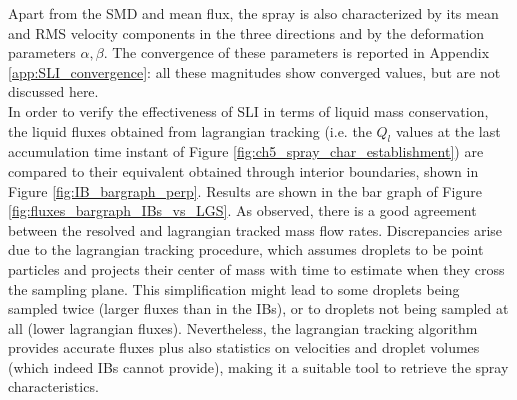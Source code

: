 Apart from the SMD and mean flux, the spray is also characterized by its mean and RMS velocity components in the three directions and by the deformation parameters $\alpha, \beta$. The convergence of these parameters is reported in Appendix \ref{app:SLI_convergence}: all these magnitudes show converged values, but are not discussed here. \\



 In order to verify the effectiveness of SLI in terms of liquid mass conservation, the liquid fluxes obtained from lagrangian tracking (i.e. the $Q_l$ values at the last accumulation time instant of Figure \ref{fig:ch5_spray_char_establishment}) are compared to their equivalent obtained through interior boundaries, shown in Figure \ref{fig:IB_bargraph_perp}. Results are shown in the bar graph of Figure \ref{fig:fluxes_bargraph_IBs_vs_LGS}. As observed, there is a good agreement between the resolved and lagrangian tracked mass flow rates. Discrepancies arise due to the lagrangian tracking procedure, which assumes droplets to be point particles and projects their center of mass with time to estimate when they cross the sampling plane. This simplification might lead to some droplets being sampled twice (larger fluxes than in the IBs), or to droplets not being sampled at all (lower lagrangian fluxes). Nevertheless, the lagrangian tracking algorithm provides accurate fluxes plus also statistics on velocities and droplet volumes (which indeed IBs cannot provide), making it a suitable tool to retrieve the spray characteristics.  

\clearpage

